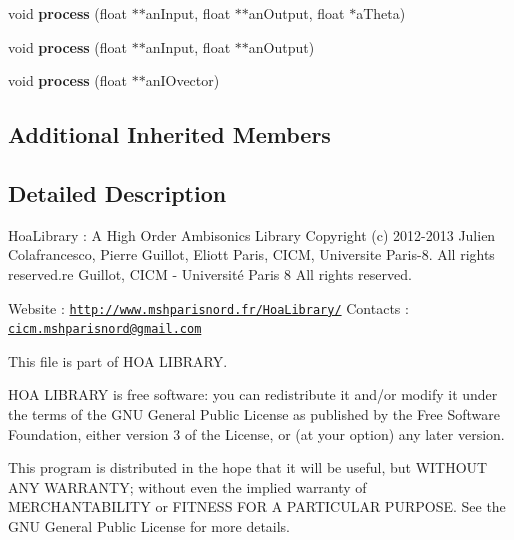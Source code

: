 \begin{DoxyCompactItemize}
\item 
\hypertarget{class_ambisonic_rotate_a5148f90cb041d14c3019e750e8e76c51}{void {\bfseries process} (float $\ast$$\ast$an\-Input, float $\ast$$\ast$an\-Output, float $\ast$a\-Theta)}\label{class_ambisonic_rotate_a5148f90cb041d14c3019e750e8e76c51}

\item 
\hypertarget{class_ambisonic_rotate_a3368bfcc5764cffce92905c3acc89380}{void {\bfseries process} (float $\ast$$\ast$an\-Input, float $\ast$$\ast$an\-Output)}\label{class_ambisonic_rotate_a3368bfcc5764cffce92905c3acc89380}

\item 
\hypertarget{class_ambisonic_rotate_af9e6cec0c56a01ad9e6e7f8b3ea12e7b}{void {\bfseries process} (float $\ast$$\ast$an\-I\-Ovector)}\label{class_ambisonic_rotate_af9e6cec0c56a01ad9e6e7f8b3ea12e7b}

\end{DoxyCompactItemize}
\subsection*{Additional Inherited Members}


\subsection{Detailed Description}
Hoa\-Library \-: A High Order Ambisonics Library Copyright (c) 2012-\/2013 Julien Colafrancesco, Pierre Guillot, Eliott Paris, C\-I\-C\-M, Universite Paris-\/8. All rights reserved.\-re Guillot, C\-I\-C\-M -\/ Université Paris 8 All rights reserved.

Website \-: \href{http://www.mshparisnord.fr/HoaLibrary/}{\tt http\-://www.\-mshparisnord.\-fr/\-Hoa\-Library/} Contacts \-: \href{mailto:cicm.mshparisnord@gmail.com}{\tt cicm.\-mshparisnord@gmail.\-com}

This file is part of H\-O\-A L\-I\-B\-R\-A\-R\-Y.

H\-O\-A L\-I\-B\-R\-A\-R\-Y is free software\-: you can redistribute it and/or modify it under the terms of the G\-N\-U General Public License as published by the Free Software Foundation, either version 3 of the License, or (at your option) any later version.

This program is distributed in the hope that it will be useful, but W\-I\-T\-H\-O\-U\-T A\-N\-Y W\-A\-R\-R\-A\-N\-T\-Y; without even the implied warranty of M\-E\-R\-C\-H\-A\-N\-T\-A\-B\-I\-L\-I\-T\-Y or F\-I\-T\-N\-E\-S\-S F\-O\-R A P\-A\-R\-T\-I\-C\-U\-L\-A\-R P\-U\-R\-P\-O\-S\-E. See the G\-N\-U General Public License for more details.

